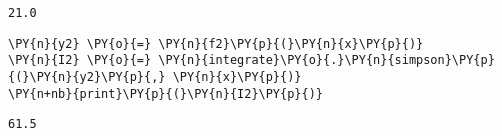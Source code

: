     \begin{Verbatim}[commandchars=\\\{\}]
21.0
    \end{Verbatim}

    \begin{tcolorbox}[breakable, size=fbox, boxrule=1pt, pad at break*=1mm,colback=cellbackground, colframe=cellborder]
\begin{Verbatim}[commandchars=\\\{\}]
\PY{n}{y2} \PY{o}{=} \PY{n}{f2}\PY{p}{(}\PY{n}{x}\PY{p}{)}
\PY{n}{I2} \PY{o}{=} \PY{n}{integrate}\PY{o}{.}\PY{n}{simpson}\PY{p}{(}\PY{n}{y2}\PY{p}{,} \PY{n}{x}\PY{p}{)}
\PY{n+nb}{print}\PY{p}{(}\PY{n}{I2}\PY{p}{)}
\end{Verbatim}
\end{tcolorbox}

    \begin{Verbatim}[commandchars=\\\{\}]
61.5
    \end{Verbatim}
